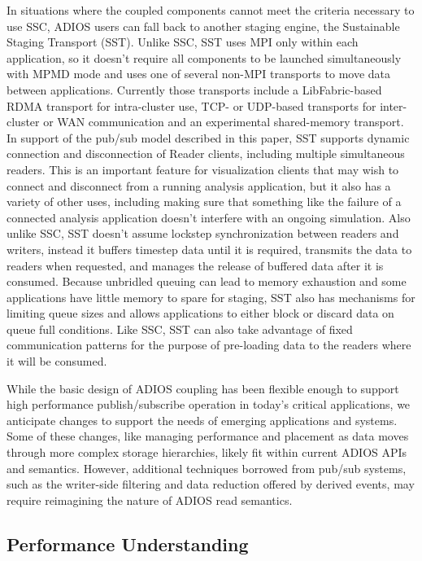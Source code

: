 In situations where the coupled components cannot meet the criteria necessary to use SSC, ADIOS users can fall back to another staging engine, the Sustainable Staging Transport (SST).  Unlike SSC, SST uses MPI only within each application, so it doesn't require all components to be launched simultaneously with MPMD mode and uses one of several non-MPI transports to move data between applications.  Currently those transports include a LibFabric-based RDMA transport for intra-cluster use, TCP- or UDP-based transports for inter-cluster or WAN communication and an experimental shared-memory transport.  In support of the pub/sub model described in this paper, SST supports dynamic connection and disconnection of Reader clients, including multiple simultaneous readers.  This is an important feature for visualization clients that may wish to connect and disconnect from a running analysis application, but it also has a variety of other uses, including making sure that something like the failure of a connected analysis application doesn't interfere with an ongoing simulation.  Also unlike SSC, SST doesn't assume lockstep synchronization between readers and writers, instead it buffers timestep data until it is required, transmits the data to readers when requested, and manages the release of buffered data after it is consumed.  Because unbridled queuing can lead to memory exhaustion and some applications have little memory to spare for staging, SST also has mechanisms for limiting queue sizes and allows applications to either block or discard data on queue full conditions.  Like SSC, SST can also take advantage of fixed communication patterns for the purpose of pre-loading data to the readers where it will be consumed.  

While the basic design of ADIOS coupling has been flexible enough to support high performance publish/subscribe operation in today's critical applications, we anticipate changes to support the needs of emerging applications and systems.  Some of these changes, like managing performance and placement as data moves through more complex storage hierarchies, likely fit within current ADIOS APIs and semantics.  However, additional techniques borrowed from pub/sub systems, such as the writer-side filtering and data reduction offered by derived events\cite{Eisenhauer2006}, may require reimagining the nature of ADIOS read semantics.


\subsection{Performance Understanding 
}
\label{sec:performance}

